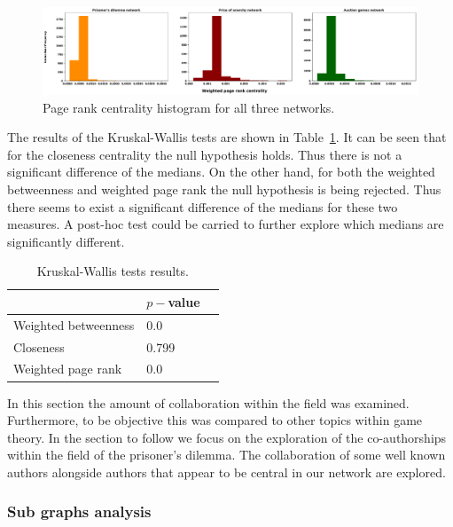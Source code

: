 \documentclass{article}
\begin{document}
\begin{figure}[!hbtp]
    \centering
    \includegraphics[width=\textwidth]{./assets/images/page_rank_hist.pdf}
    \caption{Page rank centrality histogram for all three networks.}
    \label{fig:page_rank_hist}
\end{figure}

The results of the Kruskal-Wallis tests are shown in Table~\ref{table:kruskal_wallis_results}.
It can be seen that for the closeness centrality the null hypothesis holds. Thus
there is not a significant difference of the medians. On the other hand, for
both the weighted betweenness and weighted page rank the null hypothesis is being
rejected. Thus there seems to exist a significant difference of the medians for these two
measures. A post-hoc test could be carried to further explore which medians 
are significantly different.

\begin{table}[!hbtp]
    \begin{center}
    \begin{tabular}{llc}
\toprule
& \(p-\)value &   \\
\midrule
Weighted betweenness    & 0.0   \\
Closeness               & 0.799 \\
Weighted page rank      & 0.0   \\
\bottomrule
    \end{tabular}
    \end{center}
    \caption{Kruskal-Wallis tests results.}\label{table:kruskal_wallis_results}
\end{table}

In this section the amount of collaboration within the field was examined.
Furthermore, to be objective this was compared to other topics within game
theory. In the section to follow we focus on the exploration of the co-authorships
within the field of the prisoner's dilemma. The collaboration of some well known
authors alongside authors that appear to be central in our network are explored.

\subsubsection{Sub graphs analysis}
\end{document}
